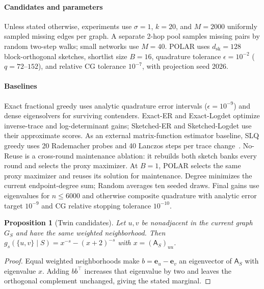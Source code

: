 \documentclass[conference]{IEEEtran}
\newtheorem{proposition}{Proposition}
\theoremstyle{definition}
\newcommand{\POLAR}{\textsc{POLAR}}
\newcommand{\dsk}{d_{\mathrm{sk}}}
\newcommand{\matA}{\mathsf A}
\begin{document}
\paragraph{Candidates and parameters}
Unless stated otherwise, experiments use $\sigma=1$, $k=20$, and
$M=2000$ uniformly sampled missing edges per graph. A separate 2-hop
pool samples missing pairs by random two-step walks; small networks use
$M=40$. \POLAR{} uses $\dsk=128$ block-orthogonal sketches, shortlist
size $B=16$, quadrature tolerance $\epsilon=10^{-2}$ ($q=72$--$152$),
and relative CG tolerance $10^{-7}$, with projection seed 2026.

\paragraph{Baselines}
Exact fractional greedy uses analytic quadrature error intervals
($\epsilon=10^{-9}$) and dense eigensolvers for surviving contenders.
Exact-ER and Exact-Logdet optimize inverse-trace and log-determinant
gains; Sketched-ER and Sketched-Logdet use their approximate scores.
As an external matrix-function estimator baseline, SLQ greedy uses
20 Rademacher probes and 40 Lanczos steps per trace
change~\cite{ubaru2017}. No-Reuse is a cross-round maintenance
ablation: it rebuilds both sketch banks every round and selects the
proxy maximizer. At $B=1$, \POLAR{} selects the same proxy maximizer
and reuses its solution for maintenance. Degree minimizes the current
endpoint-degree sum; Random averages ten seeded draws. Final gains
use eigenvalues for $n\le6000$ and otherwise composite quadrature
with analytic error target $10^{-9}$ and CG relative stopping
tolerance $10^{-10}$.

\begin{proposition}[Twin candidates]
\label{prop:twins}
Let $u,v$ be nonadjacent in the current graph $G_S$ and have the same
weighted neighborhood. Then
$g_s(\{u,v\}\mid S)=x^{-s}-(x+2)^{-s}$ with $x=(\matA_S)_{uu}$.
\end{proposition}
\begin{proof}
Equal weighted neighborhoods make $b=\bm e_u-\bm e_v$ an eigenvector
of $\matA_S$ with eigenvalue $x$. Adding $bb^\top$ increases that eigenvalue
by two and leaves the orthogonal complement unchanged, giving the
stated marginal.
\end{proof}
\end{document}
